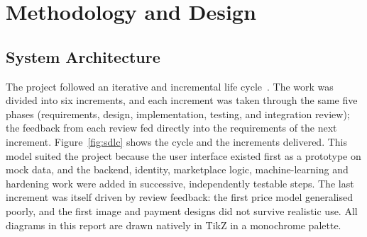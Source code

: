 \documentclass[12pt,letterpaper,twoside,openany]{report}
\begin{document}
\chapter{Methodology and Design}\label{ch:design}

\section{System Architecture}
The project followed an iterative and incremental life cycle~\cite{larman}. The work was divided into
six increments, and each increment was taken through the same five phases (requirements, design,
implementation, testing, and integration review); the feedback from each review fed directly into the
requirements of the next increment. Figure~\ref{fig:sdlc} shows the cycle and the increments delivered.
This model suited the project because the user interface existed first as a prototype on mock data,
and the backend, identity, marketplace logic, machine-learning and hardening work were added in
successive, independently testable steps. The last increment was itself driven by review feedback:
the first price model generalised poorly, and the first image and payment designs did not survive
realistic use. All diagrams in this report are drawn natively in TikZ in a monochrome palette.
\end{document}
